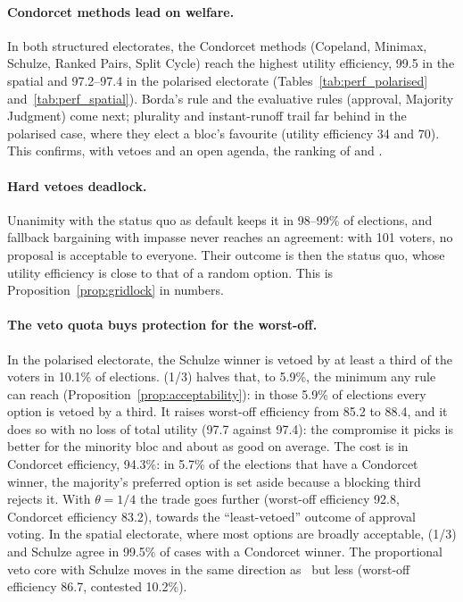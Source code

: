 \paragraph{Condorcet methods lead on welfare.} In both structured electorates, the Condorcet methods
(Copeland, Minimax, Schulze, Ranked Pairs, Split Cycle) reach the highest utility efficiency, 99.5 in
the spatial and 97.2--97.4 in the polarised electorate (Tables~\ref{tab:perf_polarised}
and~\ref{tab:perf_spatial}). Borda's rule and the evaluative rules (approval, Majority Judgment) come next;
plurality and instant-runoff trail far behind in the polarised case, where they elect a bloc's
favourite (utility efficiency 34 and 70). This confirms, with vetoes and an open agenda, the ranking of
\citet{Merrill1984} and \citet{GreenArmytageTidemanCosman2016}.

\paragraph{Hard vetoes deadlock.} Unanimity with the status quo as default keeps it in 98--99\% of
elections, and fallback bargaining with impasse never reaches an agreement: with 101 voters, no
proposal is acceptable to everyone. Their outcome is then the status quo, whose utility efficiency is close to that of a random option. This is Proposition~\ref{prop:gridlock} in numbers.

\paragraph{The veto quota buys protection for the worst-off.} In the polarised electorate, the Schulze
winner is vetoed by at least a third of the voters in 10.1\% of elections. \QVC(1/3) halves that, to
5.9\%, the minimum any rule can reach (Proposition~\ref{prop:acceptability}): in those 5.9\% of elections
every option is vetoed by a third. It raises worst-off efficiency from 85.2 to 88.4, and it does so with
no loss of total utility (97.7 against 97.4): the compromise it picks is better for the minority bloc
and about as good on average. The cost is in Condorcet efficiency, 94.3\%: in 5.7\% of the elections that have a Condorcet winner, the
majority's preferred option is set aside because a blocking third rejects it. With $\theta = 1/4$ the
trade goes further (worst-off efficiency 92.8, Condorcet efficiency 83.2), towards the ``least-vetoed''
outcome of approval voting. In the spatial electorate, where most options are broadly acceptable,
\QVC(1/3) and Schulze agree in 99.5\% of cases with a Condorcet winner. The proportional veto core with
Schulze moves in the same direction as \QVC\ but less (worst-off efficiency 86.7, contested 10.2\%).


